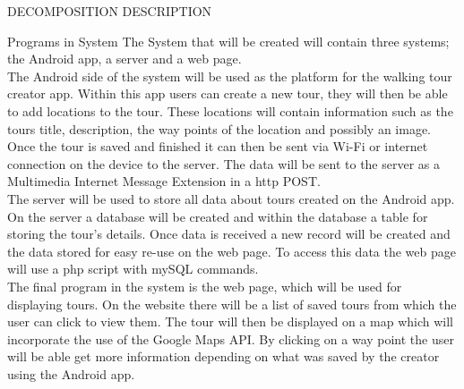 \documentclass{article}
\begin{document}
	\begin{section}{DECOMPOSITION DESCRIPTION}
		\begin{subsection}{Programs in System}
		The System that will be created will contain three systems; the Android app, a server and a web page. \\

		The Android side of the system will be used as the platform for the walking tour creator app. Within this app users can create a new tour, they will then be able to add locations to the tour. These locations will contain information such as the tours title, description, the way points of the location and possibly an image. Once the tour is saved and finished it can then be sent via Wi-Fi or internet connection on the device to the server. The data will be sent to the server as a Multimedia Internet Message Extension in a http POST.\\

		The server will be used to store all data about tours created on the Android app. On the server a database will be created and within the database a table for storing the tour's details. Once data is received a new record will be created and the data stored for easy re-use on the web page. To access this data the web page will use a php script with mySQL commands.\\

		The final program in the system is the web page, which will be used for displaying tours. On the website there will be a list of saved tours from which the user can click to view them. The tour will then be displayed on a map which will incorporate the use of the Google Maps API. By clicking on a way point the user will be able get more information depending on what was saved by the creator using the Android app.
		\end{subsection}
	\end{section}
	
\end{document}
